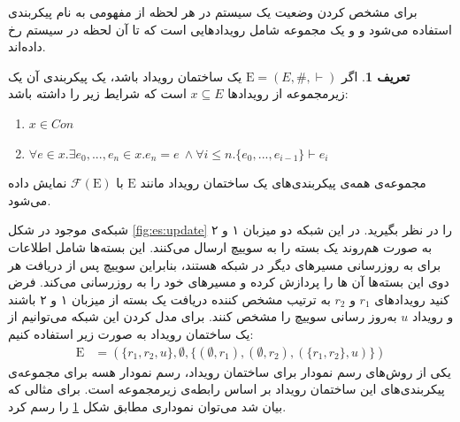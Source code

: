 \documentclass[
msc,
irfonts
]{./tex/tehran-thesis}
\newcommand{\پ}{پروژه/پایان‌نامه/رساله }
\theoremstyle{definition}
\newtheorem{definition}{تعریف}[section]
\theoremstyle{theorem}
\theoremstyle{definition}
\numberwithin{algorithm}{chapter}
\newcommand{\s}[1]{\{#1\}}
\newcommand{\e}{\emptyset}
\newcommand{\crd}[4][above]{
    \node[draw,circle,inner sep=2pt,fill,label={[#1]:#4}] at (#2,#3) {};
}
\newcommand{\lf}[1]{\LTRfootnote{#1}}
\begin{document}
برای مشخص کردن وضعیت یک سیستم در هر لحظه از مفهومی به نام پیکر‌بندی\lf{Configuration}
استفاده می‌شود و
و یک مجموعه شامل رویدادهایی است که تا آن لحظه در سیستم رخ داده‌اند.
\begin{definition}
    \label{def:configuration}
    اگر
    $\mathrm{E} = (E,\#,\vdash)$
    یک ساختمان رویداد باشد، یک پیکربندی آن یک زیرمجموعه از رویداد‌ها
    $x \subseteq E$
    است که شرایط زیر را داشته باشد:
    \begin{enumerate}
        \item $x \in Con$
        \item $\forall e \in x. \exists e_0,...,e_n \in x. e_n = e \ \wedge
                  \forall i \leq n. \s{e_0,...,e_{i-1}} \vdash e_i$
    \end{enumerate}
\end{definition}
مجموعه‌ی همه‌ی پیکربندی‌های یک ساختمان رویداد مانند
$\mathrm{E}$
با
$\mathcal{F}(\mathrm{E})$
نمایش داده می‌شود.

شبکه‌ی موجود در شکل
\ref{fig:es:update}
را در نظر بگیرید.
در این شبکه دو میزبان ۱ و ۲ به صورت هم‌روند یک بسته را به سوییچ ارسال می‌کنند.
این بسته‌ها شامل اطلاعات برای به روزرسانی مسیر‌های دیگر در شبکه هستند، بنابراین سوییچ پس از دریافت هر دوی این بسته‌ها آن ها را پردازش کرده و مسیر‌های خود را به روزرسانی می‌کند.
فرض کنید رویدادهای 
$r_1$
و
$r_2$
به ترتیب مشخص کننده‌ دریافت یک بسته از میزبان ۱ و ۲ باشند و 
رویداد 
$u$
به‌روز رسانی سوییچ را مشخص کنند.
برای مدل کردن این شبکه می‌توانیم از یک ساختمان رویداد به صورت زیر استفاده کنیم:
\begin{align*}
    \mathrm{E} & = (
    \s{r_1,r_2,u},
    \e, \s{(\e,r_1),(\e,r_2),(\s{r_1,r_2},u)}
    )
\end{align*}
یکی از روش‌های رسم نمودار برای ساختمان رویداد، رسم نمودار هسه\lf{Hasse}
برای مجموعه‌ی پیکربندی‌های این ساختمان رویداد بر اساس رابطه‌ی زیرمجموعه است.
برای مثالی که بیان شد می‌توان نموداری مطابق شکل
\ref{fig:es:configs}
را رسم کرد.
\begin{figure}
    \centering
    \caption{}
    \label{fig:es:configs}
\end{figure}
\end{document}

